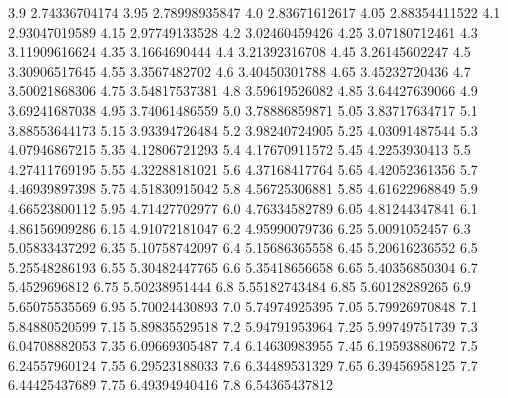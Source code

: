             3.9    2.74336704174
           3.95    2.78998935847
            4.0    2.83671612617
           4.05    2.88354411522
            4.1    2.93047019589
           4.15    2.97749133528
            4.2    3.02460459426
           4.25    3.07180712461
            4.3    3.11909616624
           4.35     3.1664690444
            4.4    3.21392316708
           4.45    3.26145602247
            4.5    3.30906517645
           4.55     3.3567482702
            4.6    3.40450301788
           4.65    3.45232720436
            4.7    3.50021868306
           4.75    3.54817537381
            4.8    3.59619526082
           4.85    3.64427639066
            4.9    3.69241687038
           4.95    3.74061486559
            5.0    3.78886859871
           5.05    3.83717634717
            5.1    3.88553644173
           5.15    3.93394726484
            5.2    3.98240724905
           5.25    4.03091487544
            5.3    4.07946867215
           5.35    4.12806721293
            5.4    4.17670911572
           5.45     4.2253930413
            5.5    4.27411769195
           5.55    4.32288181021
            5.6    4.37168417764
           5.65    4.42052361356
            5.7    4.46939897398
           5.75    4.51830915042
            5.8    4.56725306881
           5.85    4.61622968849
            5.9    4.66523800112
           5.95    4.71427702977
            6.0    4.76334582789
           6.05    4.81244347841
            6.1    4.86156909286
           6.15    4.91072181047
            6.2    4.95990079736
           6.25     5.0091052457
            6.3    5.05833437292
           6.35    5.10758742097
            6.4    5.15686365558
           6.45    5.20616236552
            6.5    5.25548286193
           6.55    5.30482447765
            6.6    5.35418656658
           6.65    5.40356850304
            6.7     5.4529696812
           6.75    5.50238951444
            6.8    5.55182743484
           6.85    5.60128289265
            6.9    5.65075535569
           6.95    5.70024430893
            7.0    5.74974925395
           7.05    5.79926970848
            7.1    5.84880520599
           7.15    5.89835529518
            7.2    5.94791953964
           7.25    5.99749751739
            7.3    6.04708882053
           7.35    6.09669305487
            7.4    6.14630983955
           7.45    6.19593880672
            7.5    6.24557960124
           7.55    6.29523188033
            7.6    6.34489531329
           7.65    6.39456958125
            7.7    6.44425437689
           7.75    6.49394940416
            7.8    6.54365437812
